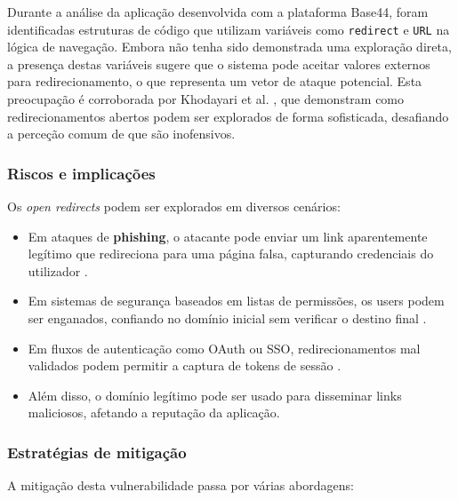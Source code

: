 Durante a análise da aplicação desenvolvida com a plataforma Base44, foram identificadas estruturas de código que utilizam variáveis como \texttt{redirect} e \texttt{URL} na lógica de navegação. Embora não tenha sido demonstrada uma exploração direta, a presença destas variáveis sugere que o sistema pode aceitar valores externos para redirecionamento, o que representa um vetor de ataque potencial. Esta preocupação é corroborada por Khodayari et al. \cite{ref34}, que demonstram como redirecionamentos abertos podem ser explorados de forma sofisticada, desafiando a perceção comum de que são inofensivos.

\subsubsection{Riscos e implicações}
\label{subsubsec:riscos-implicacoes-open-redirects}

Os \textit{open redirects} podem ser explorados em diversos cenários:

\begin{itemize}
    \item Em ataques de \textbf{phishing}, o atacante pode enviar um link aparentemente legítimo que redireciona para uma página falsa, capturando credenciais do utilizador \cite{ref35}.
    
    \item Em sistemas de segurança baseados em listas de permissões, os users podem ser enganados, confiando no domínio inicial sem verificar o destino final \cite{ref34}.
    
    \item Em fluxos de autenticação como OAuth ou SSO, redirecionamentos mal validados podem permitir a captura de tokens de sessão \cite{ref36}.
    
    \item Além disso, o domínio legítimo pode ser usado para disseminar links maliciosos, afetando a reputação da aplicação.
\end{itemize}

\subsubsection{Estratégias de mitigação}
\label{subsubsec:estrategias-mitigacao-open-redirects}

A mitigação desta vulnerabilidade passa por várias abordagens:


